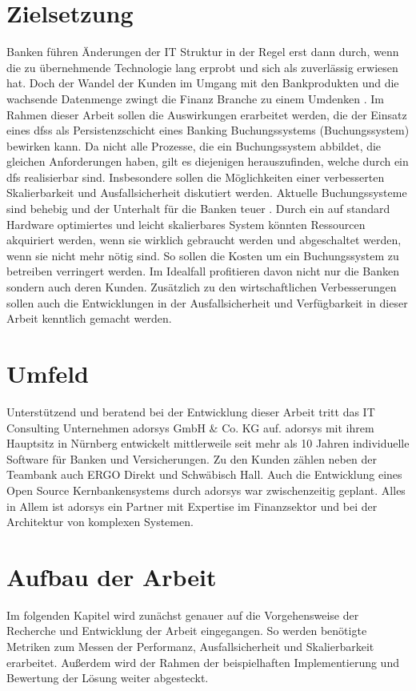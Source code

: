 \documentclass[12pt,oneside,a4paper,parskip]{scrbook}
\begin{document}
\section{Zielsetzung}

Banken führen Änderungen der IT Struktur in der Regel erst dann durch, wenn die zu übernehmende Technologie lang erprobt und sich als zuverlässig erwiesen hat. Doch der Wandel der Kunden im Umgang mit den Bankprodukten und die wachsende Datenmenge zwingt die Finanz Branche zu einem Umdenken \cite{bigdataBigStorage}. Im Rahmen dieser Arbeit sollen die Auswirkungen erarbeitet werden, die der Einsatz eines \acp{dfs} als Persistenzschicht eines Banking Buchungssystems (Buchungssystem) bewirken kann. Da nicht alle Prozesse, die ein Buchungssystem abbildet, die gleichen Anforderungen haben, gilt es diejenigen herauszufinden, welche durch ein \ac{dfs} realisierbar sind. Insbesondere sollen die Möglichkeiten einer verbesserten Skalierbarkeit und Ausfallsicherheit diskutiert werden. Aktuelle Buchungssysteme sind behebig und der Unterhalt für die Banken teuer \cite{bankingsCosts}. Durch ein auf standard Hardware optimiertes und leicht skalierbares System könnten Ressourcen akquiriert werden, wenn sie wirklich gebraucht werden und abgeschaltet werden, wenn sie nicht mehr nötig sind. So sollen die Kosten um ein Buchungssystem zu betreiben verringert werden. Im Idealfall profitieren davon nicht nur die Banken sondern auch deren Kunden. Zusätzlich zu den wirtschaftlichen Verbesserungen sollen auch die Entwicklungen in der Ausfallsicherheit und Verfügbarkeit in dieser Arbeit kenntlich gemacht werden.

\section{Umfeld}
Unterstützend und beratend bei der Entwicklung dieser Arbeit tritt das IT Consulting Unternehmen adorsys GmbH \& Co. KG auf. adorsys mit ihrem Hauptsitz in Nürnberg entwickelt mittlerweile seit mehr als 10 Jahren individuelle Software für Banken und Versicherungen. Zu den Kunden zählen neben der Teambank auch ERGO Direkt und Schwäbisch Hall. Auch die Entwicklung eines Open Source Kernbankensystems durch adorsys war zwischenzeitig geplant. Alles in Allem ist adorsys ein Partner mit Expertise im Finanzsektor und bei der Architektur von komplexen Systemen.

\section{Aufbau der Arbeit}
Im folgenden Kapitel wird zunächst genauer auf die Vorgehensweise der Recherche und Entwicklung der Arbeit eingegangen. So werden benötigte Metriken zum Messen der Performanz, Ausfallsicherheit und Skalierbarkeit erarbeitet. Außerdem wird der Rahmen der beispielhaften Implementierung und Bewertung der Lösung weiter abgesteckt.
\end{document}
